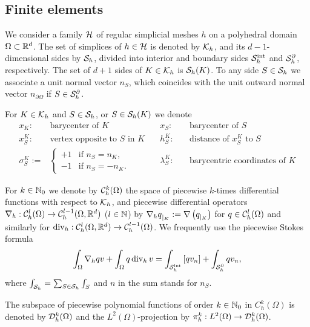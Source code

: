 \subsection{Finite elements}\label{subsec:}
%
%
We consider a family $\mathcal H$ of regular simplicial meshes $h$ on a polyhedral domain $\Omega\subset \mathbb R^d$. 
The set of simplices of $h\in\mathcal H$ is denoted by $\mathcal K_h$, and its $d-1$-dimensional sides by $\mathcal S_h$, divided into interior and boundary sides $\mathcal S^{\rm int}_h$ and $\mathcal S^{\partial}_h$, respectively. 
The set of $d+1$ sides of $K\in\mathcal K_h$ is $\mathcal S_h(K)$. To any side $S\in\mathcal S_h$ we associate a unit normal vector $n_S$, which coincides with the unit outward normal vector $n_{\partial\Omega}$ if $S\in\mathcal S^{\partial}_h$.

For $K\in\mathcal K_h$ and $S\in\mathcal S_h$, or $S\in\mathcal S_h(K)$ we denote
%
\begin{align*}
x_K:\quad& \mbox{barycenter of $K$} \quad& x_S:\quad & \mbox{barycenter of $S$}\\
x_S^K:\quad & \mbox{vertex opposite to $S$ in $K$} \quad& h_S^K:\quad & \mbox{distance of $x_S^K$ to $S$}\\
\sigma_{S}^K :=&\begin{cases}
+1 & \mbox{if $n_S=n_K$},\\
-1 & \mbox{if $n_S=-n_K$}.
\end{cases}\quad&
\lambda_S^K:\quad& \mbox{barycentric coordinates of $K$} 
\end{align*}

For $k\in\mathbb N_0$ we denote by $\mathcal{C}_h^k(\Omega)$ the space of piecewise $k$-times differential functions with respect to $\mathcal K_h$, and 
piecewise differential operators $\nabla_h:\mathcal{C}_h^l(\Omega)\to \mathcal{C}_h^{l-1}(\Omega,\mathbb R^d)$ ($l\in\mathbb N$) by 
${\nabla_h q}_{|_{K}} := \nabla\left({q}_{|_{K}}\right)$ for $q\in \mathcal{C}_h^l(\Omega)$ and similarly for 
$\operatorname{div}_h: \mathcal{C}_h^{l}(\Omega,\mathbb R^d)\to \mathcal{C}_h^{l-1}(\Omega)$.
We frequently use the piecewise Stokes formula
%
\begin{equation}\label{eq:StokesPiecewise}
\int_{\Omega} \nabla_h q v + \int_{\Omega} q \operatorname{div}_h v = \int_{\mathcal S^{\rm int}_h}\left[q v_n\right] +  \int_{\mathcal S^{\partial}_h}q v_n,
\end{equation}
%
where $\int_{\mathcal S_h}=\sum_{S\in\mathcal S_h}\int_S$ and $n$ in the sum stands for $n_S$.

The subspace of piecewise polynomial functions of order $k\in\mathbb N_0$ in $C^k_h(\Omega)$ is denoted by $\mathcal{D}_h^k(\Omega)$ and the $L^2(\Omega)$-projection by $\pi_h^k:L^2(\Omega)\to\mathcal{D}_h^k(\Omega)$.

